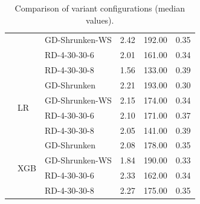 \begin{table}[ht]
\begin{tabular}{lllrrr}
		                             &                          & GD-Shrunken-WS   & 2.42         & 192.00              & 0.35                    \\\cmidrule(lr){3-6}
		                             &                          & RD-4-30-30-6     & 2.01         & 161.00              & 0.34                    \\\cmidrule(lr){3-6}
		                             &                          & RD-4-30-30-8     & 1.56         & 133.00              & 0.39                    \\\cmidrule(lr){2-6}
		                             & \multirow[t]{4}{*}{LR}   & GD-Shrunken      & 2.21         & 193.00              & 0.30                    \\\cmidrule(lr){3-6}
		                             &                          & GD-Shrunken-WS   & 2.15         & 174.00              & 0.34                    \\\cmidrule(lr){3-6}
		                             &                          & RD-4-30-30-6     & 2.10         & 171.00              & 0.37                    \\\cmidrule(lr){3-6}
		                             &                          & RD-4-30-30-8     & 2.05         & 141.00              & 0.39                    \\\cmidrule(lr){2-6}
		                             & \multirow[t]{4}{*}{XGB}  & GD-Shrunken      & 2.08         & 178.00              & 0.35                    \\\cmidrule(lr){3-6}
		                             &                          & GD-Shrunken-WS   & 1.84         & 190.00              & 0.33                    \\\cmidrule(lr){3-6}
		                             &                          & RD-4-30-30-6     & 2.33         & 162.00              & 0.34                    \\\cmidrule(lr){3-6}
		                             &                          & RD-4-30-30-8     & 2.27         & 175.00              & 0.35                    \\
		\bottomrule
	\end{tabular}
	\caption{Comparison of variant configurations (median values).}
\end{table}

\clearpage


